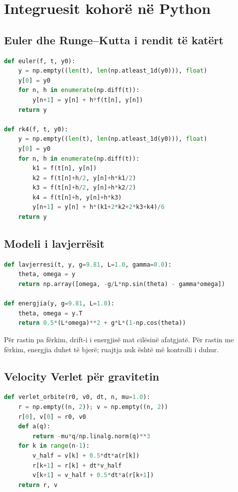 \section{Integruesit kohorë në Python}
\subsection{Euler dhe Runge--Kutta i rendit të katërt}
\begin{lstlisting}[language=Python,caption={Dy integrues të përgjithshëm për sisteme ODE.}]
def euler(f, t, y0):
    y = np.empty((len(t), len(np.atleast_1d(y0))), float)
    y[0] = y0
    for n, h in enumerate(np.diff(t)):
        y[n+1] = y[n] + h*f(t[n], y[n])
    return y

def rk4(f, t, y0):
    y = np.empty((len(t), len(np.atleast_1d(y0))), float)
    y[0] = y0
    for n, h in enumerate(np.diff(t)):
        k1 = f(t[n], y[n])
        k2 = f(t[n]+h/2, y[n]+h*k1/2)
        k3 = f(t[n]+h/2, y[n]+h*k2/2)
        k4 = f(t[n]+h, y[n]+h*k3)
        y[n+1] = y[n] + h*(k1+2*k2+2*k3+k4)/6
    return y
\end{lstlisting}

\subsection{Modeli i lavjerrësit}
\begin{lstlisting}[language=Python]
def lavjerresi(t, y, g=9.81, L=1.0, gamma=0.0):
    theta, omega = y
    return np.array([omega, -g/L*np.sin(theta) - gamma*omega])

def energjia(y, g=9.81, L=1.0):
    theta, omega = y.T
    return 0.5*(L*omega)**2 + g*L*(1-np.cos(theta))
\end{lstlisting}
Për rastin pa fërkim, drift-i i energjisë mat cilësinë afatgjatë. Për rastin me fërkim, energjia duhet të bjerë; ruajtja nuk është më kontrolli i duhur.

\subsection{Velocity Verlet për gravitetin}
\begin{lstlisting}[language=Python,caption={Skema simplektike për orbitën.}]
def verlet_orbite(r0, v0, dt, n, mu=1.0):
    r = np.empty((n, 2)); v = np.empty((n, 2))
    r[0], v[0] = r0, v0
    def a(q):
        return -mu*q/np.linalg.norm(q)**3
    for k in range(n-1):
        v_half = v[k] + 0.5*dt*a(r[k])
        r[k+1] = r[k] + dt*v_half
        v[k+1] = v_half + 0.5*dt*a(r[k+1])
    return r, v
\end{lstlisting}

